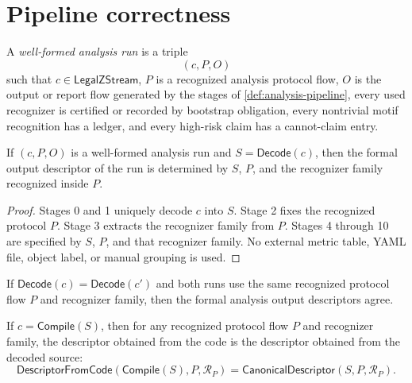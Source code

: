 \section{Pipeline correctness}
\label{sec:analysis-pipeline-correctness}

\begin{definition}
\label{def:analysis-pipeline-well-formed-run}
A \emph{well-formed analysis run} is a triple
$$
  (c,P,O)
$$
such that $c\in\mathsf{LegalZStream}$, $P$ is a recognized analysis protocol flow, $O$ is the output or report flow generated by the stages of \autoref{def:analysis-pipeline}, every used recognizer is certified or recorded by bootstrap obligation, every nontrivial motif recognition has a ledger, and every high-risk claim has a cannot-claim entry.
\end{definition}

\begin{theorem}
\label{thm:analysis-pipeline-source-determined}
If $(c,P,O)$ is a well-formed analysis run and $S=\mathsf{Decode}(c)$, then the formal output descriptor of the run is determined by $S$, $P$, and the recognizer family recognized inside $P$.
\end{theorem}

\begin{proof}
Stages 0 and 1 uniquely decode $c$ into $S$. Stage 2 fixes the recognized protocol $P$. Stage 3 extracts the recognizer family from $P$. Stages 4 through 10 are specified by $S$, $P$, and that recognizer family. No external metric table, YAML file, object label, or manual grouping is used.
\end{proof}

\begin{corollary}
\label{cor:analysis-pipeline-same-decoded-same-output}
If $\mathsf{Decode}(c)=\mathsf{Decode}(c')$ and both runs use the same recognized protocol flow $P$ and recognizer family, then the formal analysis output descriptors agree.
\end{corollary}

\begin{theorem}
\label{thm:analysis-pipeline-roundtrip-invariant}
If $c=\mathsf{Compile}(S)$, then for any recognized protocol flow $P$ and recognizer family, the descriptor obtained from the code is the descriptor obtained from the decoded source:
$$
  \mathsf{DescriptorFromCode}(\mathsf{Compile}(S),P,\mathcal R_P)
  =
  \mathsf{CanonicalDescriptor}(S,P,\mathcal R_P).
$$
\end{theorem}

